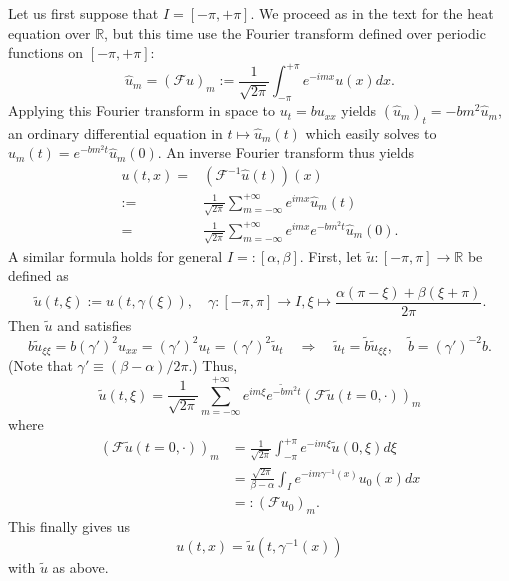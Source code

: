 \documentclass{article}
\begin{document}
\begin{itemize}
Let us first suppose that $I = [-\pi,+\pi]$. We proceed as in the text for the heat equation over $\mathbb{R}$, but this time use the Fourier transform defined over periodic functions on $[-\pi,+\pi]$:
\begin{equation*}
\hat{u}_m = \left( \mathcal{F}u \right)_m := \frac{1}{\sqrt{2\pi}} \int_{-\pi}^{+\pi} e^{-imx} u(x) dx.
\end{equation*}
Applying this Fourier transform in space to $u_t = b u_{xx}$ yields $\left( \hat{u}_m \right)_t = -bm^2 \hat{u}_m$, an ordinary differential equation in $t \mapsto \hat{u}_m(t)$ which easily solves to $\hat{u}_m(t) = e^{-bm^2t} \hat{u}_m(0)$. An inverse Fourier transform thus yields
\begin{align*}
u(t,x) = {} & \left( \mathcal{F}^{-1} \hat{u}(t) \right)(x) \\
      := {} & \frac{1}{\sqrt{2\pi}} \sum_{m=-\infty}^{+\infty} e^{imx} \hat{u}_m(t) \\
       = {} & \frac{1}{\sqrt{2\pi}} \sum_{m=-\infty}^{+\infty} e^{imx} e^{-bm^2t} \hat{u}_m(0).
\end{align*}
A similar formula holds for general $I =: [\alpha,\beta]$. First, let $\tilde{u} : [-\pi,\pi] \to \mathbb{R}$ be defined as
\begin{equation*}
\tilde{u}(t,\xi) := u \left( t, \gamma(\xi) \right), \quad \gamma : [-\pi,\pi] \to I, \xi \mapsto \frac{\alpha (\pi - \xi) + \beta (\xi + \pi)}{2\pi}.
\end{equation*}
Then $\tilde{u}$ and satisfies
\begin{equation*}
b \tilde{u}_{\xi\xi} = b \left( \gamma' \right)^2 u_{xx} = \left( \gamma' \right)^2 u_t = \left( \gamma' \right)^2 \tilde{u}_t \quad \Rightarrow \quad \tilde{u}_t = \tilde{b} \tilde{u}_{\xi\xi}, \quad \tilde{b} = \left( \gamma' \right)^{-2} b.
\end{equation*}
(Note that $\gamma' \equiv (\beta - \alpha) / 2\pi$.) Thus,
\begin{equation*}
\tilde{u}(t,\xi) = \frac{1}{\sqrt{2\pi}} \sum_{m=-\infty}^{+\infty} e^{im\xi} e^{-\tilde{b}m^2t} \left( \mathcal{F} \tilde{u}(t=0,\cdot) \right)_m
\end{equation*}
where
\begin{align*}
\left( \mathcal{F} \tilde{u}(t=0,\cdot) \right)_m
 & = \frac{1}{\sqrt{2\pi}} \int_{-\pi}^{+\pi} e^{-im\xi} \tilde{u}(0,\xi) d\xi \\
 & = \frac{\sqrt{2\pi}}{\beta - \alpha} \int_I e^{-im\gamma^{-1}(x)} u_0(x) dx \\
 & =: \left( \mathcal{F} u_0 \right)_m.
\end{align*}
This finally gives us
\begin{equation*}
u(t,x) = \tilde{u} \left( t, \gamma^{-1}(x) \right)
\end{equation*}
with $\tilde{u}$ as above.


\end{itemize}
\end{document}

